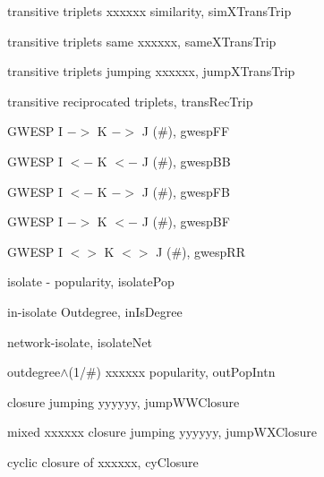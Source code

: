 \documentclass[a4paper,fleqn,11pt]{article}
\newcommand{\+}{\, + \,}
\newcommand{\sfn}[1]{\textsf{#1}}
\begin{document}
\begin{small}
\begin{itemize}
\begin{itemize}
		transitive triplets xxxxxx similarity, \sfn{simXTransTrip}

		transitive triplets same xxxxxx, \sfn{sameXTransTrip}

		transitive triplets jumping xxxxxx, \sfn{jumpXTransTrip}

		transitive reciprocated triplets, \sfn{transRecTrip}

		GWESP I $->$ K $->$ J (\#), \sfn{gwespFF}

		GWESP I $<-$ K $<-$ J (\#), \sfn{gwespBB}

		GWESP I $<-$ K $->$ J (\#), \sfn{gwespFB}

		GWESP I $->$ K $<-$ J (\#), \sfn{gwespBF}

		GWESP I $<>$ K $<>$ J (\#), \sfn{gwespRR}

		isolate - popularity, \sfn{isolatePop}

		in-isolate Outdegree, \sfn{inIsDegree}

		network-isolate, \sfn{isolateNet}

		outdegree$\wedge$(1/\#) xxxxxx popularity, \sfn{outPopIntn}

		closure jumping yyyyyy, \sfn{jumpWWClosure}

		mixed xxxxxx closure jumping yyyyyy, \sfn{jumpWXClosure}

		cyclic closure of xxxxxx, \sfn{cyClosure}


\end{itemize}
\end{itemize}
\end{small}
\end{document}
